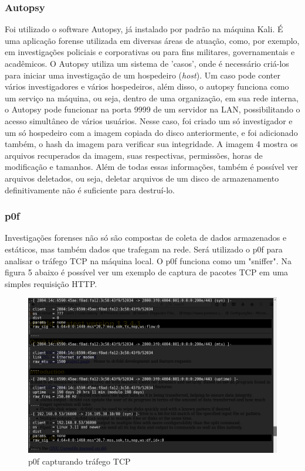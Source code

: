 \documentclass[journal]{IEEEtran}
\begin{document}
\subsubsection{Autopsy}
Foi utilizado o software Autopsy, já instalado por padrão na máquina Kali. É uma aplicação forense utilizada em diversas áreas de atuação, como, por exemplo, em investigações policiais e corporativas ou para fins militares, governamentais e acadêmicos. O Autopsy utiliza um sistema de 'casos', onde é necessário criá-los para iniciar uma investigação de um hospedeiro (\textit{host}). Um caso pode conter vários investigadores e vários hospedeiros, além disso, o autopsy funciona como um serviço na máquina, ou seja, dentro de uma organização, em sua rede interna, o Autopsy pode funcionar na porta 9999 de um servidor na LAN, possibilitando o acesso simultâneo de vários usuários. Nesse caso, foi criado um só investigador e um só hospedeiro com a imagem copiada do disco anteriormente, e foi adicionado também, o hash da imagem para verificar sua integridade. A imagem 4 mostra os arquivos recuperados da imagem, suas respectivas, permissões, horas de modificação e tamanhos. Além de todas essas informações, também é possível ver arquivos deletados, ou seja, deletar arquivos de um disco de armazenamento definitivamente não é suficiente para destruí-lo.


\subsubsection{p0f}
Investigações forenses não só são compostas de coleta de dados armazenados e estáticos, mas também dados que trafegam na rede. Será utilizado o p0f para analisar o tráfego TCP na máquina local. O p0f funciona como um "sniffer". Na figura 5 abaixo é possível ver um exemplo de captura de pacotes TCP em uma simples requisição HTTP.

\begin{figure}[h!]
	\includegraphics[width=\linewidth]{../pictures/p0f_tcp_packet.png}
	\caption{p0f capturando tráfego TCP}
	\label{fig:tcp_traffic}
\end{figure}
\end{document}
